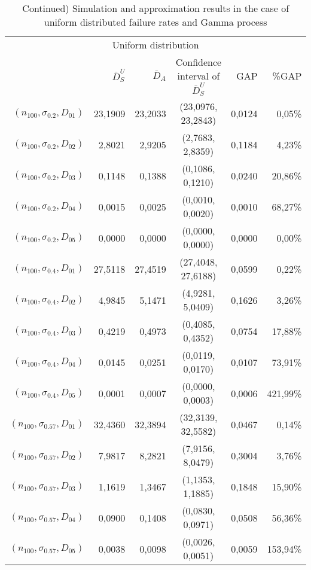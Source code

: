 \documentclass[preprint,12pt]{elsarticle}
\begin{document}
\begin{table}[htbp]
  \centering
  \caption{Continued) Simulation and approximation results in the case of uniform distributed failure rates and Gamma process}
    \begin{tabular}{rrrcrr}
    \toprule
  \multicolumn{6}{c}{Uniform distribution}\\
          & $\bar{D}_{S}^{U}$ & $\bar{D}_{A}$ & Confidence interval of $\bar{D}_{S}^{U}$ & GAP & \%GAP \\
    \midrule
    $(n_{100},\sigma_{0.2},D_{01})$ & 23,1909 & 23,2033 & (23,0976, 23,2843) & 0,0124 & 0,05\% \\
$(n_{100},\sigma_{0.2},D_{02})$ & 2,8021 & 2,9205 & (2,7683, 2,8359) & 0,1184 & 4,23\% \\
$(n_{100},\sigma_{0.2},D_{03})$ & 0,1148 & 0,1388 & (0,1086, 0,1210) & 0,0240 & 20,86\% \\
$(n_{100},\sigma_{0.2},D_{04})$& 0,0015 & 0,0025 & (0,0010, 0,0020) & 0,0010 & 68,27\% \\
$(n_{100},\sigma_{0.2},D_{05})$& 0,0000 & 0,0000 & (0,0000, 0,0000) & 0,0000 & 0,00\% \\
$(n_{100},\sigma_{0.4},D_{01})$& 27,5118 & 27,4519 & (27,4048, 27,6188) & 0,0599 & 0,22\% \\
$(n_{100},\sigma_{0.4},D_{02})$& 4,9845 & 5,1471 & (4,9281, 5,0409) & 0,1626 & 3,26\% \\
$(n_{100},\sigma_{0.4},D_{03})$& 0,4219 & 0,4973 & (0,4085, 0,4352) & 0,0754 & 17,88\% \\
$(n_{100},\sigma_{0.4},D_{04})$& 0,0145 & 0,0251 & (0,0119, 0,0170) & 0,0107 & 73,91\% \\
$(n_{100},\sigma_{0.4},D_{05})$& 0,0001 & 0,0007 & (0,0000, 0,0003) & 0,0006 & 421,99\% \\
$(n_{100},\sigma_{0.57},D_{01})$& 32,4360 & 32,3894 & (32,3139, 32,5582) & 0,0467 & 0,14\% \\
$(n_{100},\sigma_{0.57},D_{02})$& 7,9817 & 8,2821 & (7,9156, 8,0479) & 0,3004 & 3,76\% \\
$(n_{100},\sigma_{0.57},D_{03})$& 1,1619 & 1,3467 & (1,1353, 1,1885) & 0,1848 & 15,90\% \\
$(n_{100},\sigma_{0.57},D_{04})$& 0,0900 & 0,1408 & (0,0830, 0,0971) & 0,0508 & 56,36\% \\
$(n_{100},\sigma_{0.57},D_{05})$& 0,0038 & 0,0098 & (0,0026, 0,0051) & 0,0059 & 153,94\% \\
    \bottomrule
    \end{tabular}%
  \label{tab:addlabel}%
\end{table}%
\end{document}
